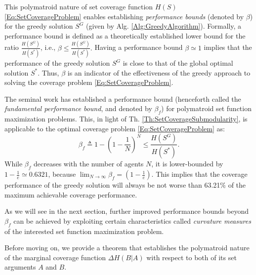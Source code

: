 \documentclass[letterpaper, 10 pt, conference]{ieeeconf}
\newcommand{\R}{\mathbb{R}}
\newtheorem{lemma}{Lemma}
\begin{document}
This polymatroid nature of set coverage function $H(S)$ \eqref{Eq:SetCoverageProblem} enables establishing \emph{performance bounds} (denoted by $\beta$) for the greedy solution $S^G$ (given by Alg. \ref{Alg:GreedyAlgorithm}). Formally, a performance bound is defined as a theoretically established lower bound for the ratio $\frac{H(S^G)}{H(S^*)}$, i.e., 
$\beta \leq \frac{H(S^G)}{H(S^*)}.$
Having a performance bound $\beta \simeq 1$ implies that the performance of the greedy solution $S^G$ is close to that of the global optimal solution $S^*$. Thus, $\beta$ is an indicator of the effectiveness of the greedy approach to solving the coverage problem \eqref{Eq:SetCoverageProblem}.   



The seminal work \cite{Nemhauser1978} has established a performance bound (henceforth called the \emph{fundamental performance bound}, and denoted by $\beta_f$) for polymatroid set function maximization problems. This, in light of Th. \ref{Th:SetCoverageSubmodularity}, is applicable to the optimal coverage problem \eqref{Eq:SetCoverageProblem} as: 
\begin{equation}\label{Eq:FundamentalPerformanceBound}
    \beta_f \triangleq 1-\left(1-\frac{1}{N}\right)^N \leq \frac{H(S^G)}{H(S^*)}.
\end{equation}
While $\beta_f$ decreases with the number of agents $N$, it is lower-bounded by $1-\frac{1}{e} \simeq 0.6321$, because $\lim_{N\rightarrow\infty} \beta_f = (1-\frac{1}{e})$. This implies that the coverage performance of the greedy solution will always be not worse than 63.21\% of the maximum achievable coverage performance.

As we will see in the next section, further improved performance bounds beyond $\beta_f$ can be achieved by exploiting certain characteristics called \emph{curvature measures} of the interested set function maximization problem. 


Before moving on, we provide a theorem that establishes the polymatroid nature of the marginal coverage function $\Delta H (B \vert A)$ with respect to both of its set arguments $A$ and $B$. 

\end{document}
